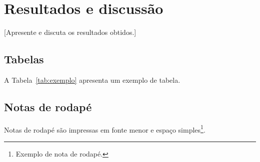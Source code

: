 \chapter{Resultados e discussão}
\label{cap:resultados}

[Apresente e discuta os resultados obtidos.]

\section{Tabelas}


A Tabela~\ref{tab:exemplo} apresenta um exemplo de tabela.

\begin{table}[htbp]
\end{table}

\section{Notas de rodapé}

Notas de rodapé são impressas em fonte menor e espaço simples\footnote{Exemplo de nota de rodapé.}.
